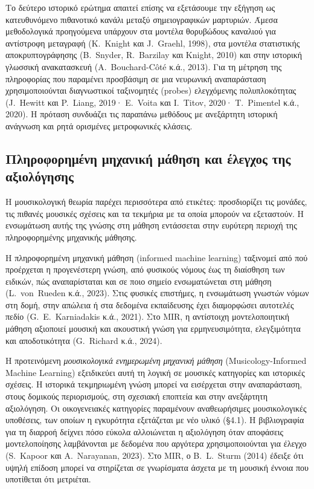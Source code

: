 \documentclass[11pt,a4paper]{article}
\begin{document}
Το δεύτερο ιστορικό ερώτημα απαιτεί επίσης να εξετάσουμε την εξήγηση ως κατευθυνόμενο πιθανοτικό κανάλι μεταξύ σημειογραφικών μαρτυριών. Άμεσα μεθοδολογικά προηγούμενα υπάρχουν στα μοντέλα θορυβώδους καναλιού για αντίστροφη μεταγραφή (K.~Knight και J.~Graehl, 1998), στα μοντέλα στατιστικής αποκρυπτογράφησης (B.~Snyder, R.~Barzilay και Knight, 2010) και στην ιστορική γλωσσική ανακατασκευή (A.~Bouchard-Côté κ.ά., 2013). Για τη μέτρηση της πληροφορίας που παραμένει προσβάσιμη σε μια νευρωνική αναπαράσταση χρησιμοποιούνται διαγνωστικοί ταξινομητές (probes) ελεγχόμενης πολυπλοκότητας (J.~Hewitt και P.~Liang, 2019· E.~Voita και I.~Titov, 2020· T.~Pimentel κ.ά., 2020). Η πρόταση συνδυάζει τις παραπάνω μεθόδους με ανεξάρτητη ιστορική ανάγνωση και ρητά ορισμένες μετροφωνικές κλάσεις.

\subsection{Πληροφορημένη μηχανική μάθηση και έλεγχος της αξιολόγησης}
Η μουσικολογική θεωρία παρέχει περισσότερα από ετικέτες: προσδιορίζει τις μονάδες, τις πιθανές μουσικές σχέσεις και τα τεκμήρια με τα οποία μπορούν να εξεταστούν. Η ενσωμάτωση αυτής της γνώσης στη μάθηση εντάσσεται στην ευρύτερη περιοχή της πληροφορημένης μηχανικής μάθησης.

Η πληροφορημένη μηχανική μάθηση (informed machine learning) ταξινομεί από πού προέρχεται η προγενέστερη γνώση, από φυσικούς νόμους έως τη διαίσθηση των ειδικών, πώς αναπαρίσταται και σε ποιο σημείο ενσωματώνεται στη μάθηση (L.~von~Rueden κ.ά., 2023). Στις φυσικές επιστήμες, η ενσωμάτωση γνωστών νόμων στη δομή, στην απώλεια ή στα δεδομένα εκπαίδευσης έχει διαμορφώσει αυτοτελές πεδίο (G.~E.~Karniadakis κ.ά., 2021). Στο MIR, η αντίστοιχη μοντελοποιητική μάθηση αξιοποιεί μουσική και ακουστική γνώση για ερμηνευσιμότητα, ελεγξιμότητα και αποδοτικότητα (G.~Richard κ.ά., 2024).

Η προτεινόμενη \emph{μουσικολογικά ενημερωμένη μηχανική μάθηση} (Musicology-Informed Machine Learning) εξειδικεύει αυτή τη λογική σε μουσικές κατηγορίες και ιστορικές σχέσεις. Η ιστορικά τεκμηριωμένη γνώση μπορεί να εισέρχεται στην αναπαράσταση, στους δομικούς περιορισμούς, στη σχεσιακή εποπτεία και στην ανεξάρτητη αξιολόγηση. Οι οικογενειακές κατηγορίες παραμένουν αναθεωρήσιμες μουσικολογικές υποθέσεις, των οποίων η εγκυρότητα εξετάζεται με νέο υλικό (§4.1). Η βιβλιογραφία για τη διαρροή δείχνει πόσο εύκολα αλλοιώνεται η αξιολόγηση όταν αποφάσεις μοντελοποίησης λαμβάνονται με δεδομένα που αργότερα χρησιμοποιούνται για έλεγχο (S.~Kapoor και A.~Narayanan, 2023). Στο MIR, ο B.~L.~Sturm (2014) έδειξε ότι υψηλή επίδοση μπορεί να στηρίζεται σε γνωρίσματα άσχετα με τη μουσική έννοια που υποτίθεται ότι μετριέται.
\end{document}
